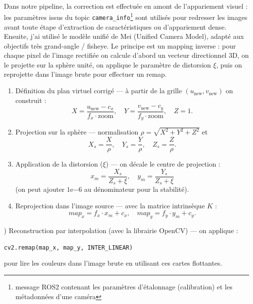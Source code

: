 \documentclass[12pt,a4paper,oneside]{report}
\begin{document}
\paragraph{}
Dans notre pipeline, la correction est effectuée en amont de l'appariement visuel : les paramètres issus du topic \texttt{camera\_info}\footnote{message ROS2 contenant les paramètres d'étalonnage (calibration) et les métadonnées d'une caméra} sont utilisés pour redresser les images avant toute étape d'extraction de caractéristiques ou d'appariement dense.\\

\hspace*{.5cm} Ensuite, j'ai utilisé le modèle unifié de Mei (Unified Camera Model), adapté aux objectifs très grand‑angle / fisheye. Le principe est un mapping inverse : pour chaque pixel de l'image rectifiée on calcule d'abord un vecteur directionnel 3D, on le projette sur la sphère unité, on applique le paramètre de distorsion $\xi$, puis on reprojette dans l'image brute pour effectuer un remap.\\

\newpage

\begin{enumerate}[label=\arabic*) , leftmargin=0pt]
\item Définition du plan virtuel corrigé — à partir de la grille $(u_{\text{new}},v_{\text{new}})$ on construit :
\[
X=\frac{u_{\text{new}}-c_x}{f_x\cdot\text{zoom}},\quad Y=\frac{v_{\text{new}}-c_y}{f_y\cdot\text{zoom}},\quad Z=1.
\]

\item Projection sur la sphère — normalisation $\rho=\sqrt{X^2+Y^2+Z^2}$ et
\[
X_s=\frac{X}{\rho},\quad Y_s=\frac{Y}{\rho},\quad Z_s=\frac{Z}{\rho}.
\]

\item Application de la distorsion ($\xi$) — on décale le centre de projection :
\[
x_m=\frac{X_s}{Z_s+\xi},\quad y_m=\frac{Y_s}{Z_s+\xi}
\]
(on peut ajouter $1\mathrm{e}{-6}$ au dénominateur pour la stabilité).

\item Reprojection dans l'image source — avec la matrice intrinsèque $K$ :
\[
map_x=f_x\cdot x_m + c_x,\quad map_y=f_y\cdot y_m + c_y.
\]
\end{enumerate}

) Reconstruction par interpolation (avec la librairie OpenCV) — on applique :
\begin{center}
\texttt{cv2.remap(map\_x, map\_y, INTER\_LINEAR)}
\end{center}
pour lire les couleurs dans l'image brute en utilisant ces cartes flottantes. 
\end{document}
